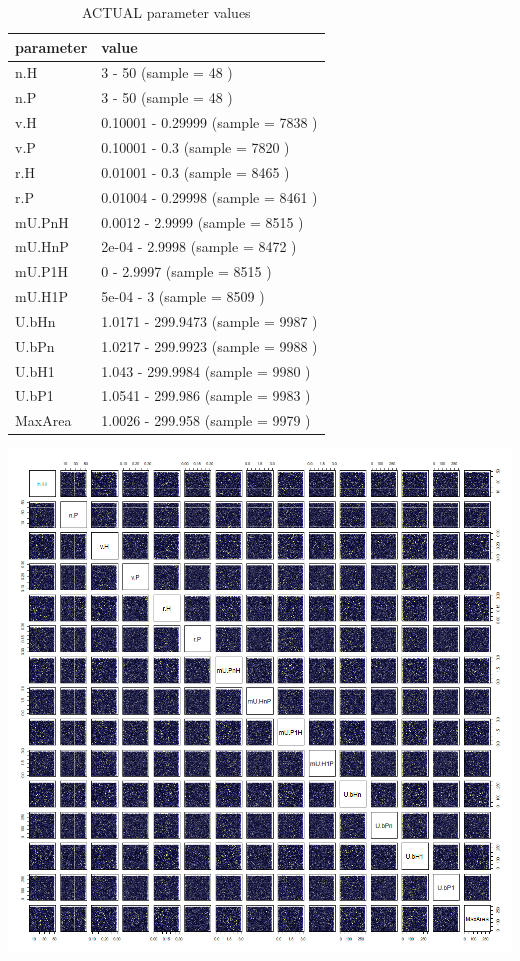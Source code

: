 \documentclass[
]{book}
\begin{document}
\begin{table}[!h]

\caption{\label{tab:5LHStablepdf}ACTUAL parameter values}
\centering
\begin{tabular}[t]{l|l}
\hline
parameter & value\\
\hline
n.H & 3 - 50 (sample = 48 )\\
\hline
n.P & 3 - 50 (sample = 48 )\\
\hline
v.H & 0.10001 - 0.29999 (sample = 7838 )\\
\hline
v.P & 0.10001 - 0.3 (sample = 7820 )\\
\hline
r.H & 0.01001 - 0.3 (sample = 8465 )\\
\hline
r.P & 0.01004 - 0.29998 (sample = 8461 )\\
\hline
mU.PnH & 0.0012 - 2.9999 (sample = 8515 )\\
\hline
mU.HnP & 2e-04 - 2.9998 (sample = 8472 )\\
\hline
mU.P1H & 0 - 2.9997 (sample = 8515 )\\
\hline
mU.H1P & 5e-04 - 3 (sample = 8509 )\\
\hline
U.bHn & 1.0171 - 299.9473 (sample = 9987 )\\
\hline
U.bPn & 1.0217 - 299.9923 (sample = 9988 )\\
\hline
U.bH1 & 1.043 - 299.9984 (sample = 9980 )\\
\hline
U.bP1 & 1.0541 - 299.986 (sample = 9983 )\\
\hline
MaxArea & 1.0026 - 299.958 (sample = 9979 )\\
\hline
\end{tabular}
\end{table}

\newpage

\includegraphics[width=1\linewidth]{plots/5_multiplePar-LHS_pairs-plot}
\end{document}
